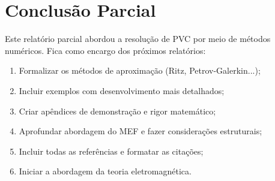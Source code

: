 \section{Conclusão Parcial}
Este relatório parcial abordou a resolução de PVC por meio de métodos numéricos. Fica como encargo dos próximos relatórios:

\begin{enumerate}
\item Formalizar os métodos de aproximação (Ritz, Petrov-Galerkin...);
\item Incluir exemplos com desenvolvimento mais detalhados;
\item Criar apêndices de demonstração e rigor matemático;
\item Aprofundar abordagem do MEF e fazer considerações estruturais;
\item Incluir todas as referências e formatar as citações;
\item Iniciar a abordagem da teoria eletromagnética.
\end{enumerate}